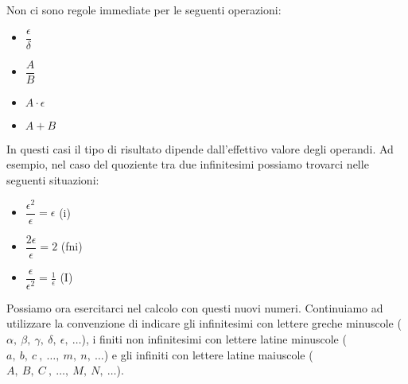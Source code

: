 \begin{osservazione}
Non ci sono regole immediate per le seguenti operazioni:
\begin{multicols}{4}
\begin{itemize} [nosep]
 \item \(\dfrac{\epsilon}{\delta}\)
 \item \(\dfrac{A}{B}\)
 \item \(A \cdot \epsilon\)
 \item \(A + B\)
\end{itemize}
\end{multicols}
In questi casi il tipo di risultato dipende dall'effettivo valore degli 
operandi. Ad esempio, nel caso del quoziente tra due infinitesimi possiamo 
trovarci nelle seguenti situazioni:
\begin{multicols}{3}
\begin{itemize} [nosep]
 \item \(\dfrac{\epsilon^2}{\epsilon} = \epsilon\) \quad (i)
 \item \(\dfrac{2\epsilon}{\epsilon} = 2\) \quad (fni)
 \item \(\dfrac{\epsilon}{\epsilon^2} = \frac{1}{\epsilon}\) \quad (I)
\end{itemize}
\end{multicols}
\end{osservazione}

Possiamo ora esercitarci nel calcolo con questi nuovi numeri. 
Continuiamo ad utilizzare la convenzione di indicare gli 
infinitesimi con lettere greche minuscole
(\(\alpha,~\beta,~\gamma,~\delta,~\epsilon,~\dots\)), 
i finiti non infinitesimi con lettere latine minuscole 
(\(a,~b,~c~,~\dots,~m,~n,~\dots\)) 
e gli infiniti con lettere latine maiuscole 
(\(A,~B,~C~,~\dots,~M,~N,~\dots\)).

